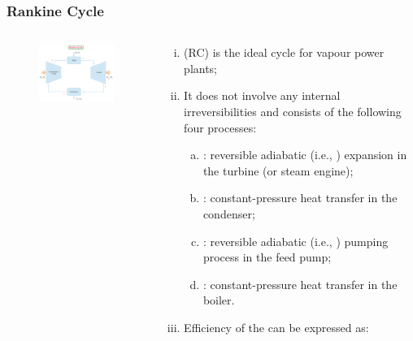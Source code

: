 \documentclass[10pt,compress,unknownkeysallowed]{beamer}
\begin{document}
\begin{frame}
 \frametitle{Rankine Cycle}
 \begin{columns}
   \begin{column}[c]{0.5\linewidth}
    \begin{figure}%
     \begin{center} 
      \includegraphics[width=6.5cm,clip]{../Pics/Simple_Rankine_Cycle}
     \end{center}
    \end{figure}  
   \end{column}
   \begin{column}[l]{0.5\linewidth}
    \begin{enumerate}[i)]\scriptsize
     \item<1-> (RC) is the ideal cycle for vapour power plants;
     \item<2-> It does not involve any internal irreversibilities and consists of the following four processes:
     \begin{enumerate}[a)]\scriptsize
      \item<3-> : reversible adiabatic (i.e., ) expansion in the turbine (or steam engine);
      \item<4-> : constant-pressure heat transfer in the condenser;
      \item<5-> : reversible adiabatic (i.e., ) pumping process in the feed pump;
      \item<6-> : constant-pressure heat transfer in the boiler.  
     \end{enumerate}
     \item<7-> Efficiency of the  can be expressed as:
    \end{enumerate}
   \end{column}
  \end{columns}
 \normalsize
\end{frame}
\end{document}
